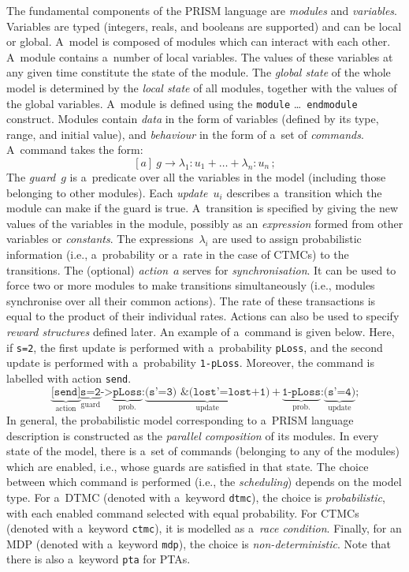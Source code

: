 \documentclass[a4paper, 11pt]{article}
\theoremstyle{definition}
\begin{document}
The fundamental components of the PRISM language are \emph{modules} and
\emph{variables}. Variables are typed (integers, reals, and booleans are
supported) and can be local or global. A~model is composed of modules
which can interact with each other. A~module contains a~number of local
variables. The values of these variables at any given time constitute
the state of the module. The \emph{global state} of the whole model is
determined by the \emph{local state} of all modules, together with the
values of the global variables. A~module is defined using the
\texttt{module}  \ldots\
\texttt{endmodule} construct. Modules contain \emph{data} in the form of
variables (defined by its type, range, and initial value), and
\emph{behaviour} in the form of a~set of \emph{commands}. A~command takes
the form:
$$
    [a]\ g \rightarrow \lambda_1 : u_1 + \ldots + \lambda_n : u_n\,;
$$
The \emph{guard}~$ g $ is a~predicate over all the variables in the model
(including those belonging to other modules). Each \emph{update}~$ u_i $
describes a~transition which the module can make if the guard is true.
A~transition is specified by giving the new values of the variables in the
module, possibly as an \emph{expression} formed from other variables or
\emph{constants}. The expressions~$ \lambda_i $ are used to assign
probabilistic information (i.e., a~probability or a~rate in the case of
CTMCs) to the transitions. The (optional) \emph{action}~$ a $ serves for
\emph{synchronisation}. It can be used to force two or more modules to make
transitions simultaneously (i.e., modules synchronise over all their common
actions). The rate of these transactions is equal to the product of their
individual rates. Actions can also be used to specify \emph{reward
structures} defined later. An example of a~command is given below. Here,
if \texttt{s=2}, the first update is performed with a~probability
\texttt{pLoss}, and the second update is performed with a~probability
\texttt{1-pLoss}. Moreover, the command is labelled with action
\texttt{send}.
$$
    \underbrace{\texttt{[send]}}_\text{action}
    \underbrace{\texttt{s=2}}_\text{guard} \texttt{->}
    \underbrace{\texttt{pLoss}}_\text{prob.} \texttt{:}
    \underbrace{\texttt{(s'=3) \& (lost'=lost+1)}}_\text{update}\,
    \texttt{+}\,\underbrace{\texttt{1-pLoss}}_\text{prob.} \texttt{:}
    \underbrace{\texttt{(s'=4)}}_\text{update}\texttt{;}
$$
In general, the probabilistic model corresponding to a~PRISM language
description is constructed as the \emph{parallel composition} of its
modules. In every state of the model, there is a~set of commands (belonging
to any of the modules) which are enabled, i.e., whose guards are satisfied
in that state. The choice between which command is performed (i.e., the
\emph{scheduling}) depends on the model type. For a~DTMC (denoted with
a~keyword \texttt{dtmc}), the choice is \emph{probabilistic}, with each
enabled command selected with equal probability. For CTMCs (denoted with
a~keyword \texttt{ctmc}), it is modelled as a~\emph{race condition}.
Finally, for an MDP (denoted with a~keyword \texttt{mdp}), the choice is
\emph{non-deterministic}. Note that there is also a~keyword \texttt{pta}
for PTAs.
\end{document}
